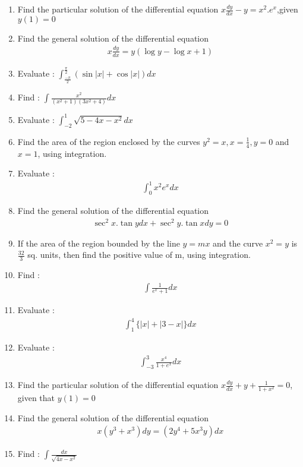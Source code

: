 \documentclass{article}
\begin{document}
\begin{enumerate}
	\item Find the particular solution of the differential equation $x \frac{dy}{dx}-y=x^2.e^x$,given $y(1)=0$
	\item Find the general solution of the differential equation
		\begin{align}
			x \frac{dy}{dx}=y(\log y-\log x +1)
		\end{align}
	\item Evaluate : $\int_\frac{-\pi}{2}^\frac{\pi}{2} (\sin |x| + \cos |x|) dx$
	\item Find : $\int \frac{x^2}{(x^2+1)(3x^2+4)} dx$
	\item Evaluate : $\int_{-2}^1 \sqrt{5-4x-x^2}dx$
	\item Find the area of the region enclosed by the curves $y^2=x, x=\frac{1}{4},y=0$ and $x=1$, using integration.
	\item Evaluate : 
		\begin{align}
			\int_0^1 x^2e^x dx
		\end{align}
	\item Find the general solution of the differential equation 
		\begin{align}
			\sec^2 x . \tan y dx + \sec^2 y . \tan x dy=0
		\end{align}
	\item If the area of the region bounded by the line $y=mx$ and the curve $x^2=y$ is $\frac{32}{3}$ sq. units, then find the positive value of m, using integration.
	\item Find : 
		\begin{align}
			\int \frac{1}{e^x +1}dx
		\end{align}
	\item Evaluate : 
		\begin{align}
			\int_1^4 \lbrace|x|+|3-x|\rbrace dx
		\end{align}
	\item Evaluate : 
		\begin{align}
			\int_{-3}^3 \frac{x^4}{1+e^x}dx
		\end{align}
	\item Find the particular solution of the differential equation
			$x\frac{dy}{dx}+y+\frac{1}{1+x^2}=0$, given that $y(1)=0$
	\item Find the general solution of the differential equation
		\begin{align}
			x(y^3+x^3)dy=(2y^4+5x^3y)dx
		\end{align}
	\item Find : $\int \frac{dx}{\sqrt{4x-x^2}}$

\end{enumerate}
\end{document}
